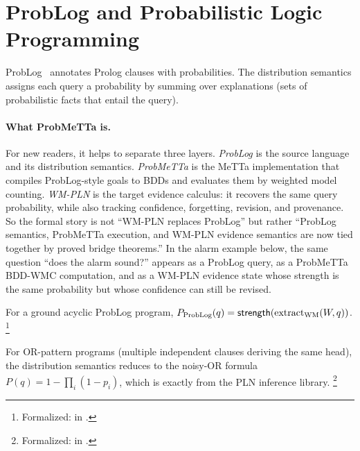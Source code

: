 \documentclass[11pt,openany]{report}
\begin{document}
\section{ProbLog and Probabilistic Logic Programming}
\label{sec:bridge-problog}

ProbLog~\cite{DeRaedt2007ProbLog} annotates Prolog clauses with
probabilities.  The distribution semantics assigns each query a
probability by summing over explanations (sets of probabilistic
facts that entail the query).

\paragraph{What ProbMeTTa is.}
For new readers, it helps to separate three layers.  \emph{ProbLog} is the
source language and its distribution semantics.  \emph{ProbMeTTa} is the
MeTTa implementation that compiles ProbLog-style goals to BDDs and evaluates
them by weighted model counting.  \emph{WM-PLN} is the target evidence
calculus: it recovers the same query probability, while also tracking
confidence, forgetting, revision, and provenance.  So the formal story is not
``WM-PLN replaces ProbLog'' but rather ``ProbLog semantics, ProbMeTTa
execution, and WM-PLN evidence semantics are now tied together by proved bridge
theorems.''  In the alarm example below, the same question
``does the alarm sound?'' appears as a ProbLog query, as a ProbMeTTa
BDD-WMC computation, and as a WM-PLN evidence state whose strength is the
same probability but whose confidence can still be revised.

\begin{theorem}[ProbLog probability = WM strength (\claimConditional{})]
\label{thm:problog-wm-strength}
For a ground acyclic ProbLog program,
$P_{\mathrm{ProbLog}}(q) =
\mathsf{strength}(\mathrm{extract}_{\mathrm{WM}}(W, q))$.%
\footnote{Formalized:
in .}
\end{theorem}

\noindent
For OR-pattern programs (multiple independent clauses deriving the
same head), the distribution semantics reduces to the noisy-OR
formula $P(q) = 1 - \prod_i (1 - p_i)$, which is exactly
 from the PLN inference library.%
\footnote{Formalized:
 in
.}
\end{document}
